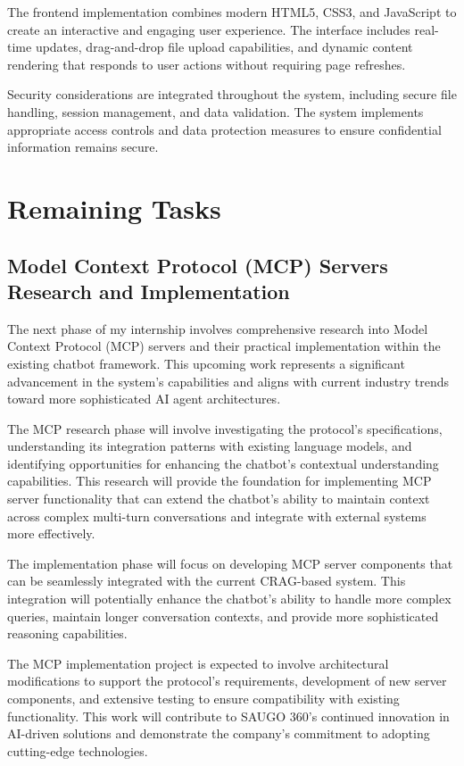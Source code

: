 \documentclass[12pt,a4paper]{article}
\begin{document}
The frontend implementation combines modern HTML5, CSS3, and JavaScript to create an interactive and engaging user experience. The interface includes real-time updates, drag-and-drop file upload capabilities, and dynamic content rendering that responds to user actions without requiring page refreshes.

Security considerations are integrated throughout the system, including secure file handling, session management, and data validation. The system implements appropriate access controls and data protection measures to ensure confidential information remains secure.

\section{Remaining Tasks}

\subsection{Model Context Protocol (MCP) Servers Research and Implementation}

The next phase of my internship involves comprehensive research into Model Context Protocol (MCP) servers and their practical implementation within the existing chatbot framework. This upcoming work represents a significant advancement in the system's capabilities and aligns with current industry trends toward more sophisticated AI agent architectures.

The MCP research phase will involve investigating the protocol's specifications, understanding its integration patterns with existing language models, and identifying opportunities for enhancing the chatbot's contextual understanding capabilities. This research will provide the foundation for implementing MCP server functionality that can extend the chatbot's ability to maintain context across complex multi-turn conversations and integrate with external systems more effectively.

The implementation phase will focus on developing MCP server components that can be seamlessly integrated with the current CRAG-based system. This integration will potentially enhance the chatbot's ability to handle more complex queries, maintain longer conversation contexts, and provide more sophisticated reasoning capabilities.

The MCP implementation project is expected to involve architectural modifications to support the protocol's requirements, development of new server components, and extensive testing to ensure compatibility with existing functionality. This work will contribute to SAUGO 360's continued innovation in AI-driven solutions and demonstrate the company's commitment to adopting cutting-edge technologies.
\end{document}
